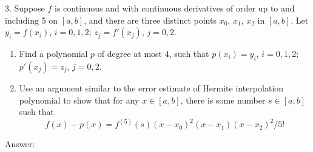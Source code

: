 \documentclass{article} %
\theoremstyle{break}
\begin{document}
3. Suppose $f$ is continuous and with continuous derivatives of order up to and including 5 on $[a, b]$, and there are three distinct points $x_0$, $x_1$, $x_2$ in $[a, b]$. Let $y_i=f(x_i)$, $i=0, 1, 2$; $z_j=f'(x_j)$, $j=0, 2$.
\begin{enumerate}
\item Find a polynomial $p$ of degree at most $4$, such that $p(x_i)=y_i$, $i=0, 1, 2$; $p'(x_j)=z_j$, $j=0, 2$.
\item Use an argument similar to the error estimate of Hermite interpolation polynomial to show that for any $x\in [a, b]$, there is some number $s\in [a, b]$ such that
  \[f(x)-p(x)=f^{(5)}(s)(x-x_0)^2(x-x_1)(x-x_2)^2/5!\]
\end{enumerate}

Answer:\\
\end{document}
